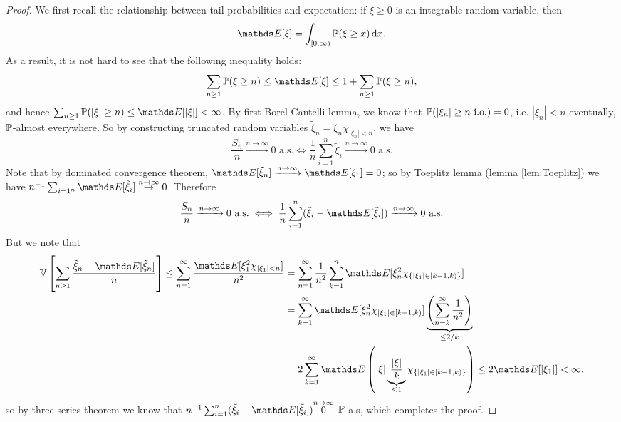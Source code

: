 \begin{proof}
We first recall the relationship between tail probabilities and expectation: if $\xi\geq 0$ is an integrable random variable, then
\begin{equation}
    \E[\xi] = \int_{[0,\infty)}\p(\xi \ge x) \, \d x.
\end{equation}
As a result, it is not hard to see that the following inequality holds:
\begin{equation}
\sum_{n\geq 1} \p(\xi \geq n) \leq \E[\xi] \leq 1+\sum_{n\geq 1} \p(\xi \geq n),
\end{equation}
and hence $\sum_{n\geq 1} \p(|\xi| \geq n) \leq \E[|\xi|] < \infty$. By first Borel-Cantelli lemma, we know that $\mathbb{P}(|\xi_n| \geq n \text{ i.o.}) = 0$, i.e. $|\xi_n|< n$ eventually, $\mathbb{P}$-almost everywhere. So by constructing truncated random variables $\tilde{\xi}_n = \xi_n\chi_{|\xi_n| < n}$, we have 
\begin{equation*}
    \frac{S_n}{n} \xrightarrow{n\to\infty} 0 \text{ a.s.} \iff \frac{1}{n} \sum_{i=1}^n \tilde{\xi}_i \xrightarrow{n\to\infty} 0 \text{ a.s.}
\end{equation*}
Note that by dominated convergence theorem, $\E[\tilde{\xi}_n] \xrightarrow{n\to\infty} \E[\xi_1] = 0$; so by Toeplitz lemma (lemma \ref{lem:Toeplitz}) we have $n^{-1} \sum_{i=1^n} \E[\tilde{\xi}_i] \overset{n\to\infty}{\to} 0$. Therefore
\begin{equation*}
    \frac{S_n}{n} \xrightarrow{n\to\infty} 0 \text{ a.s.} \iff \frac{1}{n} \sum_{i=1}^n (\tilde{\xi}_i - \E[\tilde{\xi}_i]) \xrightarrow{n\to\infty} 0 \text{ a.s.}
\end{equation*}
But we note that 
\begin{align*}
    \V\sqbracket{\sum_{n\geq 1} \frac{\tilde{\xi}_n - \E[\tilde{\xi}_n]}{n}} \leq  \sum_{n=1}^\infty \frac{\E[\xi_1^2 \chi_{|\xi_1| < n}]}{n^2}
    &= \sum_{n=1}^\infty \frac{1}{n^2} \sum_{k=1}^n \E[\xi_n^2 \chi_{\set{|\xi_1| \in [k-1,k)}}] \\
    &= \sum_{k=1}^\infty \E[\xi_n^2 \chi_{|\xi_1| \in [k-1,k)}] \underbrace{\bracket{\sum_{n=k}^\infty \frac{1}{n^2}}}_{\leq 2/k} \\
    &= 2\sum_{k=1}^\infty \E\bracket{|\xi| \underbrace{\frac{|\xi|}{k}}_{\leq 1} \chi_{\set{|\xi_1| \in [k-1,k)}}} \leq 2\E[|\xi_1|] < \infty,
\end{align*}
so by three series theorem we know that $n^{-1} \sum_{i=1}^n (\tilde{\xi}_i - \E[\tilde{\xi}_i]) \overset{n\to\infty} 0$ $\mathbb{P}$-a.s, which completes the proof.
\end{proof}


